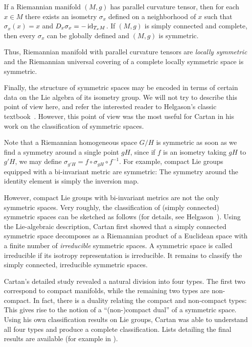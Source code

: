 \begin{thm}[\'{E}. Cartan]
	If a Riemannian manifold $(M,g)$ has parallel curvature tensor, then for each $x\in M$ there exists an isometry $\sigma_x$ defined on a neighborhood of $x$ such that $\sigma_x(x)=x$ and $D_x \sigma_x=-\operatorname{id}_{T_xM}$. If $(M,g)$ is simply connected and complete, then every $\sigma_x$ can be globally defined and $(M,g)$ is symmetric.
\end{thm}

Thus, Riemannian manifold with parallel curvature tensors are \emph{locally symmetric} and the Riemannian universal covering of a complete locally symmetric space is symmetric.

Finally, the structure of symmetric spaces may be encoded in terms of certain data on the Lie algebra of its isometry group. We will not try to describe this point of view here, and refer the interested reader to Helgason's classic textbook~\cite{Hel1978}. However, this point of view was the most useful for Cartan in his work on the classification of symmetric spaces.

Note that a Riemannian homogeneous space $G/H$ is symmetric as soon as we find a symmetry around a single point $gH$, since if $f$ is an isometry taking $gH$ to $g'H$, we may define $\sigma_{g'H}=f\circ \sigma_{gH} \circ f^{-1}$. For example, compact Lie groups equipped with a bi-invariant metric are symmetric: The symmetry around the identity element is simply the inversion map. 

However, compact Lie groups with bi-invariant metrics are not the only symmetric spaces. Very roughly, the classification of (simply connected) symmetric spaces can be sketched as follows (for details, see Helgason~\cite{Hel1978}). Using the Lie-algebraic description, Cartan first showed that a simply connected symmetric space decomposes as a Riemannian product of a Euclidean space with a finite number of \emph{irreducible} symmetric spaces. A symmetric space is called irreducible if its isotropy representation is irreducible. It remains to classify the simply connected, irreducible symmetric spaces.

Cartan's detailed study revealed a natural division into four types. The first two correspond to compact manifolds, while the remaining two types are non-compact. In fact, there is a duality relating the compact and non-compact types: This gives rise to the notion of a ``(non-)compact dual'' of a symmetric space. Using his own classification results on Lie groups, Cartan was able to understand all four types and produce a complete classification. Lists detailing the final results are available (for example in \cite[Ch.~10]{Hel1978}).

